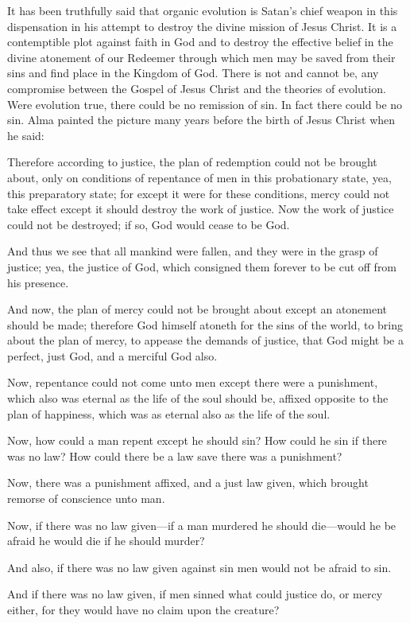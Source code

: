 It has been truthfully said that organic evolution is Satan's chief weapon in this dispensation
in his attempt to destroy the divine mission of Jesus Christ. It is a contemptible plot against
faith in God and to destroy the effective belief in the divine atonement of our Redeemer
through which men may be saved from their sins and find place in the Kingdom of God.
There is not and cannot be, any compromise between the Gospel of Jesus Christ and the
theories of evolution. Were evolution true, there could be no remission of sin. In fact there
could be no sin. Alma painted the picture many years before the birth of Jesus Christ when he
said:

Therefore according to justice, the plan of redemption could not be brought about, only on
conditions of repentance of men in this probationary state, yea, this preparatory state; for
except it were for these conditions, mercy could not take effect except it should destroy the
work of justice. Now the work of justice could not be destroyed; if so, God would cease to be
God.

And thus we see that all mankind were fallen, and they were in the grasp of justice; yea, the
justice of God, which consigned them forever to be cut off from his presence.

And now, the plan of mercy could not be brought about except an atonement should be
made; therefore God himself atoneth for the sins of the world, to bring about the plan of
mercy, to appease the demands of justice, that God might be a perfect, just God, and a
merciful God also.

Now, repentance could not come unto men except there were a punishment, which also was
eternal as the life of the soul should be, affixed opposite to the plan of happiness, which was
as eternal also as the life of the soul.

Now, how could a man repent except he should sin? How could he sin if there was no law?
How could there be a law save there was a punishment?

Now, there was a punishment affixed, and a just law given, which brought remorse of
conscience unto man.

Now, if there was no law given—if a man murdered he should die—would he be afraid he
would die if he should murder?

And also, if there was no law given against sin men would not be afraid to sin.

And if there was no law given, if men sinned what could justice do, or mercy either, for they
would have no claim upon the creature?

